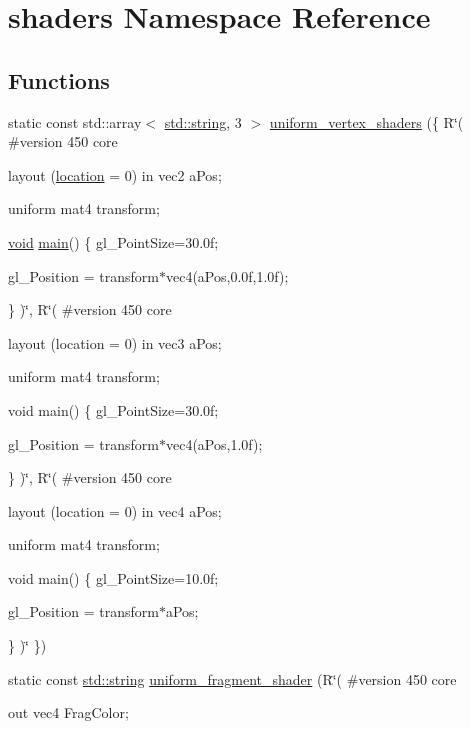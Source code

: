 \hypertarget{namespaceshaders}{}\section{shaders Namespace Reference}
\label{namespaceshaders}
\subsection*{Functions}
\begin{DoxyCompactItemize}
\item 
static const std\+::array$<$ \mbox{\hyperlink{glad_8h_ac83513893df92266f79a515488701770}{std\+::string}}, 3 $>$ \mbox{\hyperlink{namespaceshaders_a800ae51b672756c1d98fe5ef773f2b3d}{uniform\+\_\+vertex\+\_\+shaders}} (\{ R\char`\"{}(
\#version 450 core

layout (\mbox{\hyperlink{glad_8h_a6f0165ed903f22b8bb600c3e0b628e73}{location}} = 0) in vec2 a\+Pos;

uniform mat4 transform;

\mbox{\hyperlink{glad_8h_a950fc91edb4504f62f1c577bf4727c29}{void}} \mbox{\hyperlink{gtest__tests_8cpp_a3c04138a5bfe5d72780bb7e82a18e627}{main}}()
\{
gl\+\_\+\+Point\+Size=30.\+0f;

gl\+\_\+\+Position = transform$\ast$vec4(a\+Pos,0.\+0f,1.\+0f);


\}
)\char`\"{}, R\char`\"{}(
\#version 450 core

layout (location = 0) in vec3 a\+Pos;

uniform mat4 transform;

void main()
\{
gl\+\_\+\+Point\+Size=30.\+0f;

gl\+\_\+\+Position = transform$\ast$vec4(a\+Pos,1.\+0f);

\}
)\char`\"{}, R\char`\"{}(
\#version 450 core

layout (location = 0) in vec4 a\+Pos;

uniform mat4 transform;

void main()
\{
gl\+\_\+\+Point\+Size=10.\+0f;

gl\+\_\+\+Position = transform$\ast$a\+Pos;

\}
)\char`\"{} \})
\item 
static const \mbox{\hyperlink{glad_8h_ac83513893df92266f79a515488701770}{std\+::string}} \mbox{\hyperlink{namespaceshaders_a08247b475f67d2c839a8d1fe5124b569}{uniform\+\_\+fragment\+\_\+shader}} (R\char`\"{}(
\#version 450 core

out vec4 Frag\+Color;


\end{DoxyCompactItemize}
